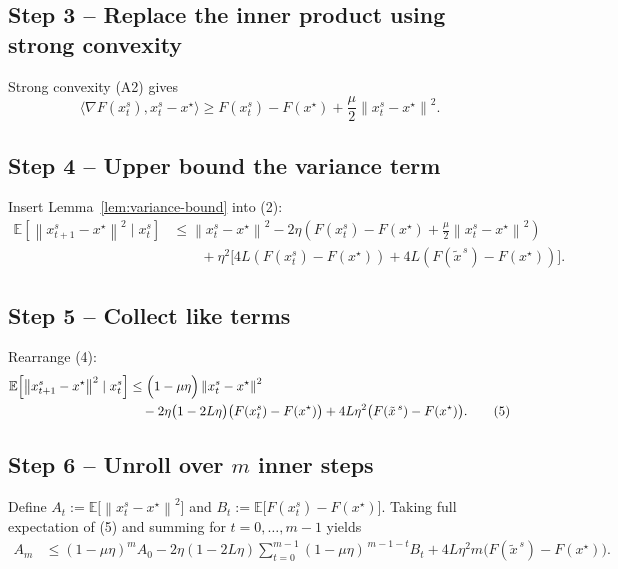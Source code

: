 \documentclass{article}
\newcommand{\E}{\mathbb{E}}
\newcommand{\norm}[1]{\left\lVert #1\right\rVert}
\begin{document}
\subsection*{Step 3 – Replace the inner product using strong convexity}
Strong convexity (A2) gives
\[
\langle \nabla F(x_{t}^{s}),x_{t}^{s}-x^{\star}\rangle
\ge F(x_{t}^{s})-F(x^{\star})+\frac{\mu}{2}\norm{x_{t}^{s}-x^{\star}}^{2}. \tag{3}
\]

\subsection*{Step 4 – Upper bound the variance term}
Insert Lemma~\ref{lem:variance-bound} into (2):
\[
\begin{aligned}
\E\!\left[\norm{x_{t+1}^{s}-x^{\star}}^{2}\mid x_{t}^{s}\right]
&\le \norm{x_{t}^{s}-x^{\star}}^{2}
   -2\eta\!\left(F(x_{t}^{s})-F(x^{\star})+\frac{\mu}{2}\norm{x_{t}^{s}-x^{\star}}^{2}\right) \\
&\qquad +\eta^{2}\!\bigl[4L(F(x_{t}^{s})-F(x^{\star}))
                     +4L(F(\tilde{x}^{\,s})-F(x^{\star}))\bigr]. \tag{4}
\end{aligned}
\]

\subsection*{Step 5 – Collect like terms}
Rearrange (4):
\[
\begin{aligned}
\E\!\left[\norm{x_{t+1}^{s}-x^{\star}}^{2}\mid x_{t}^{s}\right]
&\le \Bigl(1-\mu\eta\Bigr)\norm{x_{t}^{s}-x^{\star}}^{2}\\
&\quad -2\eta\bigl(1-2L\eta\bigr)\bigl(F(x_{t}^{s})-F(x^{\star})\bigr)
   +4L\eta^{2}\bigl(F(\tilde{x}^{\,s})-F(x^{\star})\bigr). \tag{5}
\end{aligned}
\]

\subsection*{Step 6 – Unroll over $m$ inner steps}
Define $A_t:=\E\!\bigl[\norm{x_{t}^{s}-x^{\star}}^{2}\bigr]$ and $B_t:=\E\!\bigl[F(x_{t}^{s})-F(x^{\star})\bigr]$.  
Taking full expectation of (5) and summing for $t=0,\dots,m-1$ yields
\[
\begin{aligned}
A_{m}
&\le (1-\mu\eta)^{m}A_{0}
   -2\eta(1-2L\eta)\sum_{t=0}^{m-1}(1-\mu\eta)^{\,m-1-t}B_t
   +4L\eta^{2}m\bigl(F(\tilde{x}^{\,s})-F(x^{\star})\bigr). \tag{6}
\end{aligned}
\]
\end{document}
